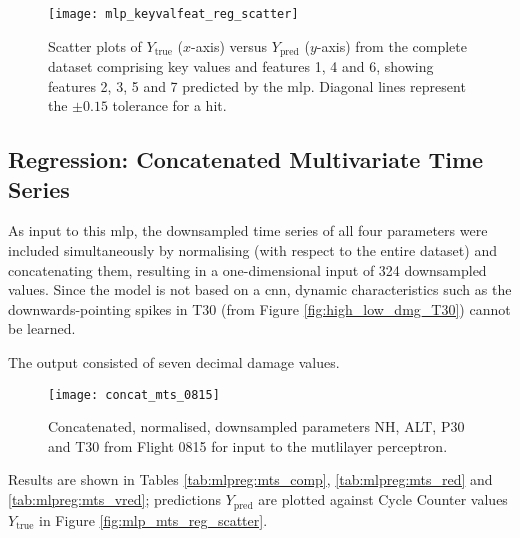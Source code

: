 \begin{figure}
    \centering
    \texttt{[image: mlp\_keyvalfeat\_reg\_scatter]}
    \caption{\label{fig:mlp_keyvalfeat_reg_scatter} Scatter plots of \(Y_\text{true}\) (\(x\)-axis) versus \(Y_\text{pred}\) (\(y\)-axis) from the complete dataset comprising key values and features 1, 4 and 6, showing features 2, 3, 5 and 7 predicted by the \ac{mlp}. Diagonal lines represent the \(\pm0.15\) tolerance for a hit.}
\end{figure}

\subsection{Regression: Concatenated Multivariate Time Series} \label{sec:model:mlpreg:mts}
As input to this \ac{mlp}, the downsampled time series of all four parameters were included simultaneously by normalising (with respect to the entire dataset) and concatenating them, resulting in a one-dimensional input of 324 downsampled values. Since the model is not based on a \ac{cnn}, dynamic characteristics such as the downwards-pointing spikes in T30 (from Figure \ref{fig:high_low_dmg_T30}) cannot be learned.

The output consisted of seven decimal damage values.

\begin{figure}
    \centering
    \texttt{[image: concat\_mts\_0815]}
    \caption{\label{fig:concat_mts_0815} Concatenated, normalised, downsampled parameters NH, ALT, P30 and T30 from Flight 0815 for input to the mutlilayer perceptron.}
\end{figure}

Results are shown in Tables \ref{tab:mlpreg:mts_comp}, \ref{tab:mlpreg:mts_red} and \ref{tab:mlpreg:mts_vred}; predictions \(Y_{\text{pred}}\) are plotted against Cycle Counter values \(Y_{\text{true}}\) in Figure \ref{fig:mlp_mts_reg_scatter}.

